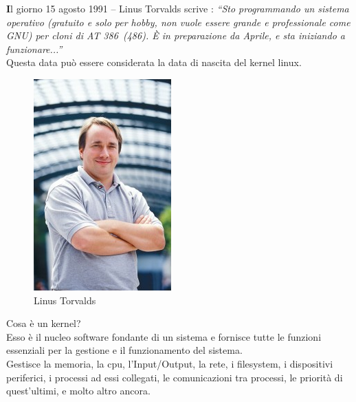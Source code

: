 \onehalfspacing
\lettrine[lines=1, loversize=0.1, lraise=0.1]{\color[cmyk]{0.5, 0, 1, 0}\bfseries I}{}l giorno 15 agosto 1991 – Linus Torvalds scrive :
{\itshape “Sto programmando un sistema operativo (gratuito e solo per hobby, non vuole essere grande e professionale come GNU) per cloni di AT 386\ (486). È in preparazione da Aprile, e sta iniziando a funzionare...''}\\

Questa data può essere considerata la data di nascita del kernel linux.\\

\begin{figure}[!htbp]
\centering
\includegraphics[scale=.40]{articoli/sistema_avanzato/immagini/torvalds.jpeg}
\caption{Linus Torvalds}
\end{figure}

Cosa è un kernel?\\

Esso è il nucleo software fondante di un sistema e fornisce tutte le funzioni essenziali per la gestione e il funzionamento del sistema.\\
Gestisce la memoria, la cpu, l'Input/Output, la rete, i filesystem, i dispositivi periferici, i processi ad essi collegati, le comunicazioni tra processi, le priorità di quest'ultimi, e molto altro ancora.\\

